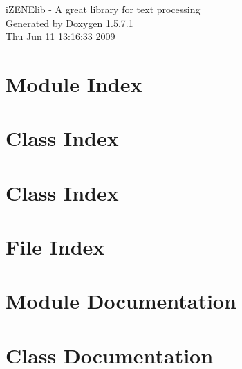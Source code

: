 \documentclass[a4paper]{book}
\begin{document}
\begin{titlepage}
\vspace*{7cm}
\begin{center}
{\Large iZENElib - A great library for text processing }\\
\vspace*{1cm}
{\large Generated by Doxygen 1.5.7.1}\\
\vspace*{0.5cm}
{\small Thu Jun 11 13:16:33 2009}\\
\end{center}
\end{titlepage}
\clearemptydoublepage
{}
\tableofcontents
\clearemptydoublepage
{}
\chapter{Module Index}

\chapter{Class Index}

\chapter{Class Index}

\chapter{File Index}

\chapter{Module Documentation}


\chapter{Class Documentation}










































\end{document}
